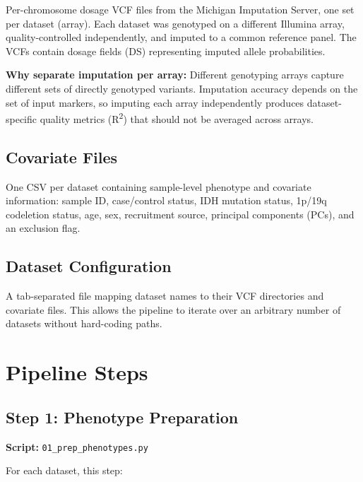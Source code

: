 \documentclass[11pt,letterpaper]{article}
\begin{document}
Per-chromosome dosage VCF files from the Michigan Imputation Server, one set per dataset (array). Each dataset was genotyped on a different Illumina array, quality-controlled independently, and imputed to a common reference panel. The VCFs contain dosage fields (DS) representing imputed allele probabilities.

\textbf{Why separate imputation per array:} Different genotyping arrays capture different sets of directly genotyped variants. Imputation accuracy depends on the set of input markers, so imputing each array independently produces dataset-specific quality metrics (R\textsuperscript{2}) that should not be averaged across arrays.

\subsection{Covariate Files}

One CSV per dataset containing sample-level phenotype and covariate information: sample ID, case/control status, IDH mutation status, 1p/19q codeletion status, age, sex, recruitment source, principal components (PCs), and an exclusion flag.

\subsection{Dataset Configuration}

A tab-separated file mapping dataset names to their VCF directories and covariate files. This allows the pipeline to iterate over an arbitrary number of datasets without hard-coding paths.

\section{Pipeline Steps}

\subsection{Step 1: Phenotype Preparation}
\label{sec:step1}

\textbf{Script:} \texttt{01\_prep\_phenotypes.py}

For each dataset, this step:
\end{document}
